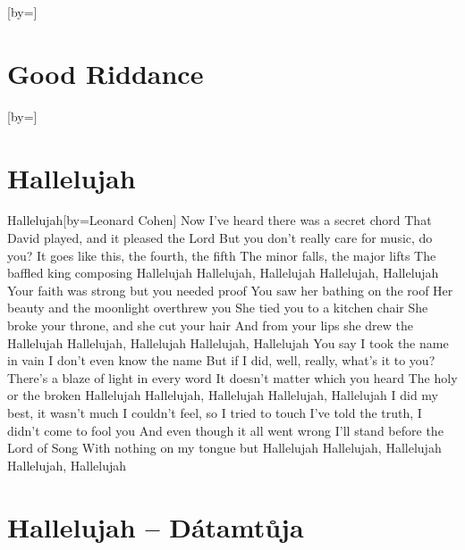 \documentclass{article}
\begin{document}
\begin{songs}{}
\begin{song}{}[by={}]
\endverse
\end{song}

\section{Good Riddance}
\begin{song}{}[by={}]
\beginverse

\endverse
\end{song}




\section{Hallelujah}
\begin{song}{Hallelujah}[by={Leonard Cohen}]
\beginverse
Now I've heard there was a secret chord
That David played, and it pleased the Lord
But you don't really care for music, do you?
It goes like this, the fourth, the fifth
The minor falls, the major lifts
The baffled king composing Hallelujah
\endverse
\beginverse
Hallelujah, Hallelujah
Hallelujah, Hallelujah
\endverse
\beginverse
Your faith was strong but you needed proof
You saw her bathing on the roof
Her beauty and the moonlight overthrew you
She tied you to a kitchen chair
She broke your throne, and she cut your hair
And from your lips she drew the Hallelujah
\endverse
\beginverse
Hallelujah, Hallelujah
Hallelujah, Hallelujah
\endverse
\beginverse
You say I took the name in vain
I don't even know the name
But if I did, well, really, what's it to you?
There's a blaze of light in every word
It doesn't matter which you heard
The holy or the broken Hallelujah
\endverse
\beginverse
Hallelujah, Hallelujah
Hallelujah, Hallelujah
\endverse
\beginverse
I did my best, it wasn't much
I couldn't feel, so I tried to touch
I've told the truth, I didn't come to fool you
And even though it all went wrong
I'll stand before the Lord of Song
With nothing on my tongue but Hallelujah
\endverse
\beginverse
Hallelujah, Hallelujah
Hallelujah, Hallelujah
\endverse
\end{song}

\section{Hallelujah -- Dátamtůja}


\end{songs}
\end{document}
